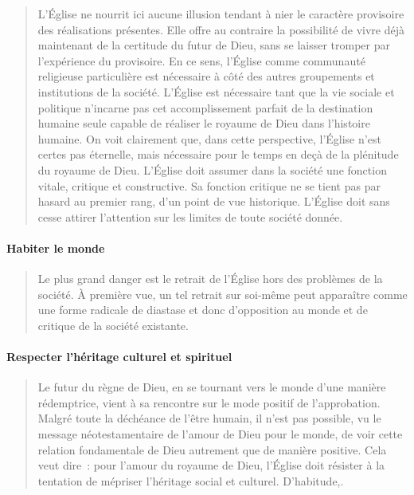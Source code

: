  \begin{quote}
     L’Église ne nourrit ici aucune illusion tendant à nier le caractère provisoire des réalisations présentes. Elle offre au contraire la possibilité de vivre déjà maintenant de la certitude du futur de Dieu, sans se laisser tromper par l’expérience du provisoire. En ce sens, l’Église comme communauté religieuse particulière est nécessaire à côté des autres groupements et institutions de la société. L’Église est nécessaire tant que la vie sociale et politique n’incarne pas cet accomplissement parfait de la destination humaine seule capable de réaliser le royaume de Dieu dans l’histoire humaine. On voit clairement que, dans cette perspective, l’Église n’est certes pas éternelle, mais nécessaire pour le temps en deçà de la plénitude du royaume de Dieu. L’Église doit assumer dans la société une fonction vitale, critique et constructive. Sa fonction critique ne se tient pas par hasard au premier rang, d’un point de vue historique. L’Église doit sans cesse attirer l’attention sur les limites de toute société donnée.\cite[pp. 99-100]{Pannenberg:RoyaumeDieu} 
\end{quote}

\paragraph{Habiter le monde}
\begin{quote}
    Le plus grand danger est le retrait de l’Église hors des problèmes de la société. À première vue, un tel retrait sur soi-même peut apparaître comme une forme radicale de diastase et donc d’opposition au monde et de critique de la société existante.\cite[p. 100]{Pannenberg:RoyaumeDieu}
\end{quote}
 
 
 \paragraph{Respecter l'héritage culturel et spirituel}
 \begin{quote}
      Le futur du règne de Dieu, en se tournant vers le monde d’une manière rédemptrice, vient à sa rencontre sur le mode positif de l’approbation. Malgré toute la déchéance de l’être humain, il n’est pas possible, vu le message néotestamentaire de l’amour de Dieu pour le monde, de voir cette relation fondamentale de Dieu autrement que de manière positive. Cela veut dire : pour l’amour du royaume de Dieu, l’Église doit résister à la tentation de mépriser l’héritage social et culturel. D’habitude,\cite[p. 105]{Pannenberg:RoyaumeDieu}. 
 \end{quote}


